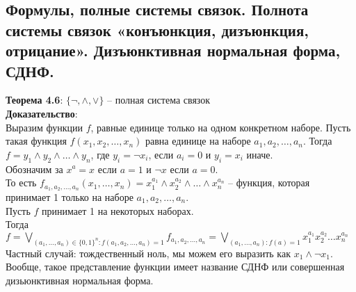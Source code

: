 \subsection{Формулы, полные системы связок. Полнота системы связок «конъюнкция, дизъюнкция, отрицание». Дизъюнктивная нормальная форма, СДНФ.}
\textbf{Теорема 4.6}: $\{\neg, \wedge, \vee\}$ -- полная система связок\\

\noindent \textbf{Доказательство}:\\

Выразим функции $f$, равные единице только на одном конкретном наборе. Пусть такая функция $f(x_1, x_2, \ldots, x_n)$ равна единице на наборе $a_1, a_2, \ldots, a_n$. Тогда $f = y_1 \wedge y_2 \wedge \ldots \wedge y_n$, где $y_i = \neg x_i$, если $a_i = 0$ и $y_i = x_i$ иначе.\\

Обозначим за $x^a = x$ если $a = 1$ и $\neg x$ если $a = 0$.\\

То есть $f_{a_1, a_2, \ldots, a_n}(x_1, \ldots, x_n) = x_1^{a_1} \wedge x_2^{a_2} \wedge \ldots \wedge x_n^{a_n}$ -- функция, которая принимает 1 только на наборе $a_1, a_2, \ldots, a_n$.\\

Пусть $f$ принимает 1 на некоторых наборах.\\

Тогда $f = \bigvee\limits_{(a_1, \ldots, a_n) \in \{0, 1\}^n : f(a_1, a_2, \ldots, a_n) = 1} f_{a_1, a_2, \ldots, a_n} = \bigvee\limits_{(a_1, \ldots, a_n): f(a) = 1}x_1^{a_1}x_2^{a_2}\ldots x_n^{a_n}$\\

Частный случай: тождественный ноль, мы можем его выразить как $x_1 \wedge \neg x_1$.\\

Вообще, такое представление функции имеет название СДНФ или совершенная дизьюнктивная нормальная форма.\\